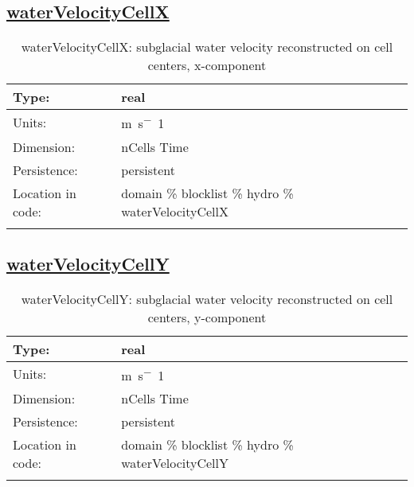 \subsection[waterVelocityCellX]{\hyperref[sec:var_tab_hydro]{waterVelocityCellX}}
\label{subsec:var_sec_hydro_waterVelocityCellX}
\begin{center}
\begin{longtable}{| p{2.0in} | p{4.0in} |}
        \hline 
        Type: & real \\
        \hline 
        Units: & \si{m.s^-1} \\
        \hline 
        Dimension: & nCells Time \\
        \hline 
        Persistence: & persistent \\
        \hline 
         Location in code: & domain \% blocklist \% hydro \% waterVelocityCellX \\
         \hline 
    \caption{waterVelocityCellX: subglacial water velocity reconstructed on cell centers, x-component}
\end{longtable}
\end{center}
\subsection[waterVelocityCellY]{\hyperref[sec:var_tab_hydro]{waterVelocityCellY}}
\label{subsec:var_sec_hydro_waterVelocityCellY}
\begin{center}
\begin{longtable}{| p{2.0in} | p{4.0in} |}
        \hline 
        Type: & real \\
        \hline 
        Units: & \si{m.s^-1} \\
        \hline 
        Dimension: & nCells Time \\
        \hline 
        Persistence: & persistent \\
        \hline 
         Location in code: & domain \% blocklist \% hydro \% waterVelocityCellY \\
         \hline 
    \caption{waterVelocityCellY: subglacial water velocity reconstructed on cell centers, y-component}
\end{longtable}
\end{center}
